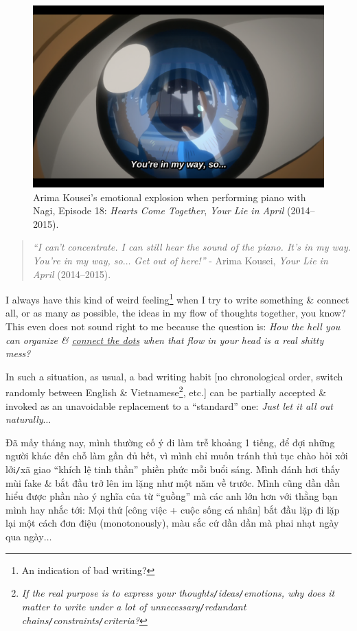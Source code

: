 \documentclass[12pt,twoside]{book}
\begin{document}
\begin{figure}[H]
	\centering
	\includegraphics[width = 12cm]{Arima_Kousei_you_are_in_my_way}
	\caption{Arima Kousei's emotional explosion when performing piano with Nagi, Episode 18: {\it Hearts Come Together}, {\it Your Lie in April} (2014--2015).}
	\label{fig2}
\end{figure}

\begin{quotation}
	{\it``I can't concentrate. I can still hear the sound of the piano. It's in my way. You're in my way, so$\ldots$ Get out of here!''} - Arima Kousei, {\it Your Lie in April} (2014--2015).
\end{quotation}

I always have this kind of weird feeling\footnote{An indication of bad writing?} when I try to write something \& connect all, or as many as possible, the ideas in my flow of thoughts together, you know? This even does not sound right to me because the question is: {\it How the hell you can organize \& \href{https://en.wikipedia.org/wiki/Connect_the_dots}{connect the dots} when that flow in your head is a real shitty mess?}

In such a situation, as usual, a bad writing habit [no chronological order, switch randomly between English \& Vietnamese\footnote{{\it If the real purpose is to express your thoughts{\tt/}ideas{\tt/}emotions, why does it matter to write under a lot of unnecessary{\tt/}redundant chains{\tt/}constraints{\tt/}criteria?}}, etc.] can be partially accepted \& invoked as an unavoidable replacement to a ``standard'' one: {\it Just let it all out naturally$\ldots$}

Đã mấy tháng nay, mình thường cố ý đi làm trễ khoảng 1 tiếng, để đợi những người khác đến chỗ làm gần đủ hết, vì mình chỉ muốn tránh thủ tục chào hỏi xởi lởi{\tt/}xã giao ``khích lệ tinh thần'' phiền phức mỗi buổi sáng. Mình đánh hơi thấy mùi fake \& bắt đầu trở lên im lặng như một năm về trước. Mình cũng dần dần hiểu được phần nào ý nghĩa của từ ``guồng'' mà các anh lớn hơn với thằng bạn mình hay nhắc tới: Mọi thứ [công việc + cuộc sống cá nhân] bắt đầu lặp đi lặp lại một cách đơn điệu (monotonously), màu sắc cứ dần dần mà phai nhạt ngày qua ngày$\ldots$
\end{document}
